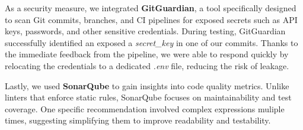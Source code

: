 As a security measure, we integrated \textbf{GitGuardian}, a tool specifically designed to scan Git commits, branches, and CI pipelines for exposed secrets such as API keys, passwords, and other sensitive credentials. During testing, GitGuardian successfully identified an exposed a \textit{secret\_key} in one of our commits. Thanks to the immediate feedback from the pipeline, we were able to respond quickly by relocating the credentials to a dedicated \textit{.env} file, reducing the risk of leakage.

Lastly, we used \textbf{SonarQube} to gain insights into code quality metrics. Unlike linters that enforce static rules, SonarQube focuses on maintainability and test coverage. One specific recommendation involved complex expressions muliple times, suggesting simplifying them to improve readability and testability.

